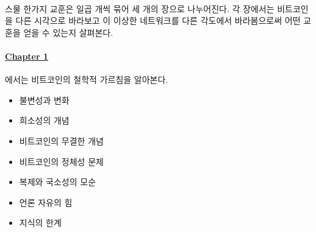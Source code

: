 \paragraph{}
스물 한가지 교훈은 일곱 개씩 묶어 세 개의 장으로 나누어진다. 
각 장에서는 비트코인을 다른 시각으로 바라보고 이 이상한 네트워크를 다른 각도에서
바라봄으로써 어떤 교훈을 얻을 수 있는지 살펴본다.


\paragraph{\hyperref[ch:philosophy]{Chapter 1}}{에서는 비트코인의 철학적 가르침을 알아본다.
	\begin{itemize}
		\item 불변성과 변화
		\item 희소성의 개념
		\item 비트코인의 무결한 개념
		\item 비트코인의 정체성 문제
		\item 복제와 국소성의 모순
		\item 언론 자유의 힘
		\item 지식의 한계
\end{itemize}}


